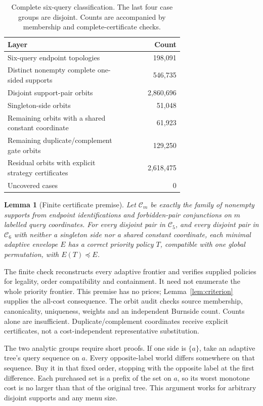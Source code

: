 \documentclass[pdflatex,sn-mathphys-num]{sn-jnl}
\theoremstyle{thmstyleone}
\newtheorem{lemma}[theorem]{Lemma}
\theoremstyle{thmstylethree}
\theoremstyle{thmstyletwo}
\begin{document}
\begin{table}[ht]
\centering\small
\begin{tabular}{@{}p{0.69\linewidth}r@{}}
\toprule
Layer & Count\\\midrule
Six-query endpoint topologies & 198,091\\
Distinct nonempty complete one-sided supports & 546,735\\
Disjoint support-pair orbits & 2,860,696\\
Singleton-side orbits & 51,048\\
Remaining orbits with a shared constant coordinate & 61,923\\
Remaining duplicate/complement gate orbits & 129,250\\
Residual orbits with explicit strategy certificates & 2,618,475\\
Uncovered cases & 0\\\bottomrule
\end{tabular}
\caption{Complete six-query classification. The last four case groups are disjoint. Counts are accompanied by membership and complete-certificate checks.}\label{tab:coverage}
\end{table}

\begin{lemma}[Finite certificate premise]\label{lem:finite}
Let $\mathcal C_m$ be exactly the family of nonempty supports from endpoint identifications and forbidden-pair conjunctions on $m$ labelled query coordinates. For every disjoint pair in $\mathcal C_5$, and every disjoint pair in $\mathcal C_6$ with neither a singleton side nor a shared constant coordinate, each minimal adaptive envelope $E$ has a correct priority policy $T$, compatible with one global permutation, with $E(T)\preceq E$.
\end{lemma}
The finite check reconstructs every adaptive frontier and verifies supplied policies for legality, order compatibility and containment. It need not enumerate the whole priority frontier. This premise has no prices; Lemma~\ref{lem:criterion} supplies the all-cost consequence. The orbit audit checks source membership, canonicality, uniqueness, weights and an independent Burnside count. Counts alone are insufficient. Duplicate/complement coordinates receive explicit certificates, not a cost-independent representative substitution.

The two analytic groups require short proofs. If one side is $\{a\}$, take an adaptive tree's query sequence on $a$. Every opposite-label world differs somewhere on that sequence. Buy it in that fixed order, stopping with the opposite label at the first difference. Each purchased set is a prefix of the set on $a$, so its worst monotone cost is no larger than that of the original tree. This argument works for arbitrary disjoint supports and any menu size.
\end{document}
